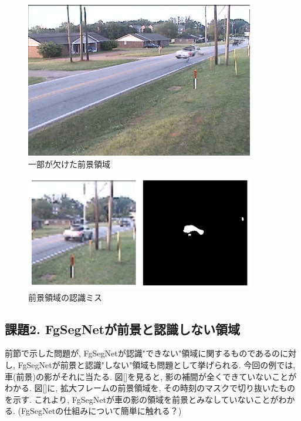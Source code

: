 \documentclass[a4paper,12pt]{jsreport}
\begin{document}
\begin{figure}[h]
  \begin{center}
    \includegraphics[width=10cm]{./zenkei_kieru.bmp}
    \caption{一部が欠けた前景領域}
  \end{center}
\end{figure}

\begin{figure}[h]
  \begin{center}
    \includegraphics[width=10cm]{./fgsegnet_miss}
    \caption{前景領域の認識ミス}
  \end{center}
\end{figure}

\subsection{課題2. FgSegNetが前景と認識しない領域}
前節で示した問題が, FgSegNetが認識"できない"領域に関するものであるのに対し, FgSegNetが前景と認識"しない"領域も問題として挙げられる. 今回の例では, 車(前景)の影がそれに当たる.
図[]を見ると, 影の補間が全くできていないことがわかる. 図[]に, 拡大フレームの前景領域を, その時刻のマスクで切り抜いたものを示す. これより, FgSegNetが車の影の領域を前景とみなしていないことがわかる. 
(FgSegNetの仕組みについて簡単に触れる？)
\end{document}
